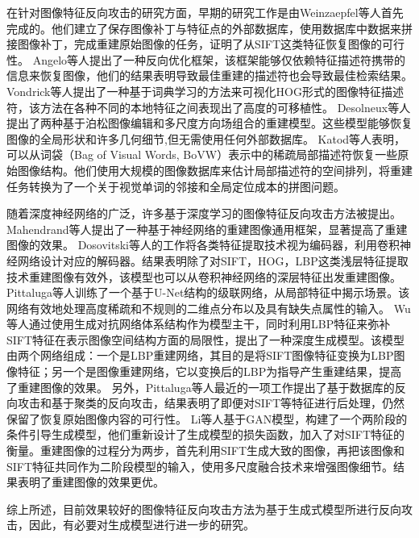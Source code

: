 在针对图像特征反向攻击的研究方面，早期的研究工作是由Weinzaepfel\cite{weinzaepfel2011reconstructing}等人首先完成的。他们建立了保存图像补丁与特征点的外部数据库，使用数据库中数据来拼接图像补丁，完成重建原始图像的任务，证明了从SIFT这类特征恢复图像的可行性。
Angelo\cite{6460288}等人提出了一种反向优化框架，该框架能够仅依赖特征描述符携带的信息来恢复图像，他们的结果表明导致最佳重建的描述符也会导致最佳检索结果。
Vondrick\cite{Vondrick_2013_ICCV}等人提出了一种基于词典学习的方法来可视化HOG形式的图像特征描述符，该方法在各种不同的本地特征之间表现出了高度的可移植性。
Desolneux\cite{10.1007/978-3-319-58771-4_11}等人提出了两种基于泊松图像编辑和多尺度方向场组合的重建模型。这些模型能够恢复图像的全局形状和许多几何细节,但无需使用任何外部数据库。
Katod\cite{Kato_2014_CVPR}等人表明，可以从词袋（Bag of Visual Words, BoVW）表示中的稀疏局部描述符恢复一些原始图像结构。他们使用大规模的图像数据库来估计局部描述符的空间排列，将重建任务转换为了一个关于视觉单词的邻接和全局定位成本的拼图问题。
\par
随着深度神经网络的广泛，许多基于深度学习的图像特征反向攻击方法被提出。
Mahendrand\cite{mahendran2015understanding}等人提出了一种基于神经网络的重建图像通用框架，显著提高了重建图像的效果。
Dosovitski\cite{dosovitskiy2016inverting}等人的工作将各类特征提取技术视为编码器，利用卷积神经网络设计对应的解码器。结果表明除了对SIFT，HOG，LBP这类浅层特征提取技术重建图像有效外，该模型也可以从卷积神经网络的深层特征出发重建图像。
Pittaluga\cite{Pittaluga_2019_CVPR}等人训练了一个基于U-Net结构的级联网络，从局部特征中揭示场景。该网络有效地处理高度稀疏和不规则的二维点分布以及具有缺失点属性的输入。
Wu\cite{9393327}等人通过使用生成对抗网络体系结构作为模型主干，同时利用LBP特征来弥补SIFT特征在表示图像空间结构方面的局限性，提出了一种深度生成模型。该模型由两个网络组成：一个是LBP重建网络，其目的是将SIFT图像特征变换为LBP图像特征；另一个是图像重建网络，它以变换后的LBP为指导产生重建结果，提高了重建图像的效果。
另外，Pittaluga\cite{Pittaluga_2023_ICCV}等人最近的一项工作提出了基于数据库的反向攻击和基于聚类的反向攻击，结果表明了即便对SIFT等特征进行后处理，仍然保留了恢复原始图像内容的可行性。
Li\cite{liDeepReverseAttack2024}等人基于GAN模型，构建了一个两阶段的条件引导生成模型，他们重新设计了生成模型的损失函数，加入了对SIFT特征的衡量。重建图像的过程分为两步，首先利用SIFT生成大致的图像，再把该图像和SIFT特征共同作为二阶段模型的输入，使用多尺度融合技术来增强图像细节。结果表明了重建图像的效果更优。
\par
综上所述，目前效果较好的图像特征反向攻击方法为基于生成式模型所进行反向攻击，因此，有必要对生成模型进行进一步的研究。
